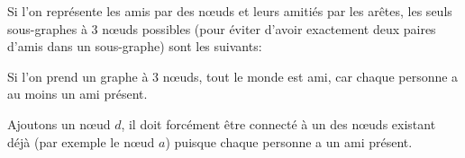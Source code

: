 \begin{solution}
Si l'on représente les amis par des nœuds et leurs amitiés par les arêtes, les seuls sous-graphes à 3 nœuds possibles (pour éviter d'avoir exactement deux paires d'amis dans un sous-graphe) sont les suivants:

\begin{center}
\hspace*{2cm}
\hspace*{2cm}
\end{center}

Si l'on prend un graphe à 3 nœuds, tout le monde est ami, car chaque personne a au moins un ami présent.

\begin{center}
\end{center}

Ajoutons un nœud $d$, il doit forcément être connecté à un des nœuds existant déjà (par exemple le nœud $a$) puisque chaque personne a un ami présent.

\begin{center}
\end{center}


\end{solution}
